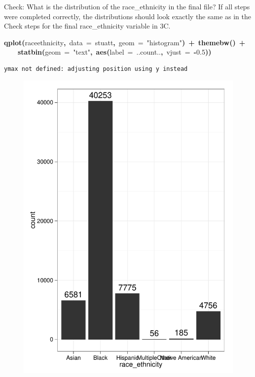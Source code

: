 \documentclass[12pt]{article}
\makeatletter
\newcommand{\hlnumber}[1]{\textcolor[rgb]{0,0,0}{#1}}%
\newcommand{\hlfunctioncall}[1]{\textcolor[rgb]{0.501960784313725,0,0.329411764705882}{\textbf{#1}}}%
\newcommand{\hlstring}[1]{\textcolor[rgb]{0.6,0.6,1}{#1}}%
\newcommand{\hlkeyword}[1]{\textcolor[rgb]{0,0,0}{\textbf{#1}}}%
\newcommand{\hlargument}[1]{\textcolor[rgb]{0.690196078431373,0.250980392156863,0.0196078431372549}{#1}}%
\newcommand{\hlsymbol}[1]{\textcolor[rgb]{0,0,0}{#1}}%
\newcommand{\hlstd}[1]{\textcolor[rgb]{0,0,0}{#1}}%
\newenvironment{kframe}{%
 \def\FrameCommand##1{\hskip\@totalleftmargin \hskip-\fboxsep
 \colorbox{shadecolor}{##1}\hskip-\fboxsep
     \hskip-\linewidth \hskip-\@totalleftmargin \hskip\columnwidth}%
 \MakeFramed {\advance\hsize-\width
   \@totalleftmargin\z@ \linewidth\hsize
   \@setminipage}}%
 {\par\unskip\endMakeFramed}
\newenvironment{knitrout}{}{} %
\renewenvironment{knitrout}{\begin{footnotesize}}{\end{footnotesize}}
\makeatother
\begin{document}
Check: What is the distribution of the race\_ethnicity in the final file? If all steps were completed correctly, the distributions 
should look exactly the same as in the Check steps for the final  race\_ethnicity variable in 3C.

\begin{knitrout}
\color{fgcolor}\begin{kframe}
\begin{flushleft}
\ttfamily\noindent
\hlfunctioncall{qplot}\hlkeyword{(}\hlsymbol{race\usebox{\hlnormalsizeboxunderscore}ethnicity}\hlkeyword{,}{\ }\hlargument{data}{\ }\hlargument{=}{\ }\hlsymbol{stuatt}\hlkeyword{,}{\ }\hlargument{geom}{\ }\hlargument{=}{\ }\hlstring{"{}histogram"{}}\hlkeyword{)}{\ }\hlkeyword{+}{\ }\hlfunctioncall{theme\usebox{\hlnormalsizeboxunderscore}bw}\hlkeyword{(}\hlkeyword{)}{\ }\hlkeyword{+}\hspace*{\fill}\\
\hlstd{}{\ }{\ }{\ }{\ }\hlfunctioncall{stat\usebox{\hlnormalsizeboxunderscore}bin}\hlkeyword{(}\hlargument{geom}{\ }\hlargument{=}{\ }\hlstring{"{}text"{}}\hlkeyword{,}{\ }\hlfunctioncall{aes}\hlkeyword{(}\hlargument{label}{\ }\hlargument{=}{\ }\hlsymbol{..count..}\hlkeyword{,}{\ }\hlargument{vjust}{\ }\hlargument{=}{\ }\hlkeyword{-}\hlnumber{0.5}\hlkeyword{)}\hlkeyword{)}\mbox{}
\normalfont
\end{flushleft}
\begin{verbatim}
ymax not defined: adjusting position using y instead
\end{verbatim}
\end{kframe}\begin{figure}[]


{\centering \includegraphics[width=.85\textwidth,height=.25\paperheight]{figure/histogramfinal} 

}
\end{figure}
\end{knitrout}
\end{document}

